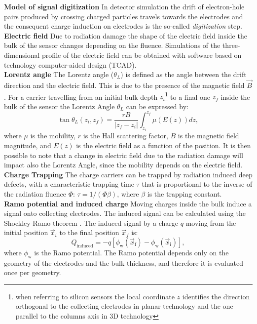 \noindent
\textbf{Model of signal digitization}
In detector simulation the drift of electron-hole pairs produced by crossing charged particles travels towards the electrodes and the consequent charge induction on electrodes is the so-called \textit{digitization} step.\\
\noindent
\textbf{Electric field} Due to radiation damage the shape of the electric field inside the bulk of the sensor changes depending on the fluence. Simulations of the three-dimensional profile of the electric field can be obtained with software based on technology computer-aided design (TCAD).\\
\noindent
\textbf{Lorentz angle}
The Lorentz angle ($\theta_L$) is defined as the angle between the drift direction and the electric field. This is due to the presence of the magnetic field $\vec{B}$. 
For a carrier travelling from an initial bulk depth $z_i$\footnote{when referring to silicon sensors the local coordinate $z$ identifies the direction orthogonal to the collecting electrodes in planar technology and the one parallel to the columns axis in 3D technology} to a final one $z_f$ inside the bulk 
of the sensor the Lorentz Angle $\theta_L$ can be expressed by:
\begin{equation}
\tan\theta_L (z_i,z_f) = \frac{rB}{|z_f - z_i |}\int^{z_f}_{z_i}\mu(E(z))dz,
\label{eq:LA}
\end{equation}
where $\mu$ is the mobility, $r$ is the Hall scattering factor, $B$ is the magnetic field magnitude, and $E(z)$ is the electric field as a function of the position. It is then possible to note that a change in electric field due to the radiation damage will impact also the Lorentz Angle, since the mobility depends on the electric field.\\

\noindent
\textbf{Charge Trapping}
The charge carriers can be trapped by radiation induced deep defects, with a characteristic
trapping time $\tau$ 
that is proportional to the inverse of the radiation fluence $\Phi$: $\tau = 1/(\Phi\beta)$, where $\beta$ is the trapping constant. \\

\noindent
\textbf{Ramo potential and induced charge}
Moving charges inside the bulk induce a signal onto collecting electrodes. The  induced signal   can be 
calculated using the Shockley-Ramo theorem \cite{Ramo}. %
The induced signal by a charge $q$ moving from the initial position $\vec{x}_i$ to the final position $\vec{x}_f$ is:
\begin{equation}
Q_{\text{induced}} = -q[\phi_{\text{w}}(\vec{x}_{\text{f}})-\phi_{\text{w}}(\vec{x}_{\text{i}})],
\label{eq:ramopotential}
\end{equation}
where $\phi_{\text{w}}$ is the Ramo potential. The Ramo potential depends only on the geometry of the electrodes and the bulk thickness, and therefore it is evaluated once per geometry.\\

